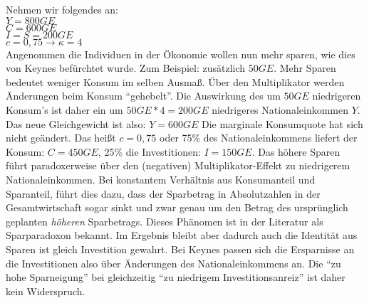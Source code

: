 Nehmen wir folgendes an:\\
$Y = 800GE$\\
$C = 600GE$\\
$I = S = 200GE$\\
$c = 0,75 \rightarrow \kappa = 4$\\

Angenommen die Individuen in der Ökonomie wollen nun mehr sparen, wie dies von Keynes befürchtet wurde. Zum Beispiel: zusätzlich $50GE$. Mehr Sparen bedeutet weniger Konsum im selben Ausmaß. Über den Multiplikator werden Änderungen beim Konsum "`gehebelt"'. Die Auswirkung des um $50GE$ niedrigeren Konsum's ist daher ein um $50GE * 4 = 200GE$ niedrigeres Nationaleinkommen $Y$. Das neue Gleichgewicht ist also: $Y = 600GE$ Die marginale Konsumquote hat sich nicht geändert. Das heißt $c = 0,75$ oder 75\% des Nationaleinkommens liefert der Konsum: $C = 450GE$, 25\% die Investitionen: $I = 150GE$. Das höhere Sparen führt paradoxerweise über den (negativen) Multiplikator-Effekt zu niedrigerem Nationaleinkommen. Bei konstantem Verhältnis aus Konsumanteil und Sparanteil, führt dies dazu, dass der Sparbetrag in Absolutzahlen in der Gesamtwirtschaft sogar sinkt und zwar genau um den Betrag des ursprünglich geplanten \textit{höheren} Sparbetrags. Dieses Phänomen ist in der Literatur als Sparparadoxon bekannt. Im Ergebnis bleibt aber dadurch auch die Identität aus Sparen ist gleich Investition gewahrt. Bei Keynes passen sich die Ersparnisse an die Investitionen also über Änderungen des Nationaleinkommens an. Die "`zu hohe Sparneigung"' bei gleichzeitig "`zu niedrigem Investitionsanreiz"' ist daher kein Widerspruch. 

